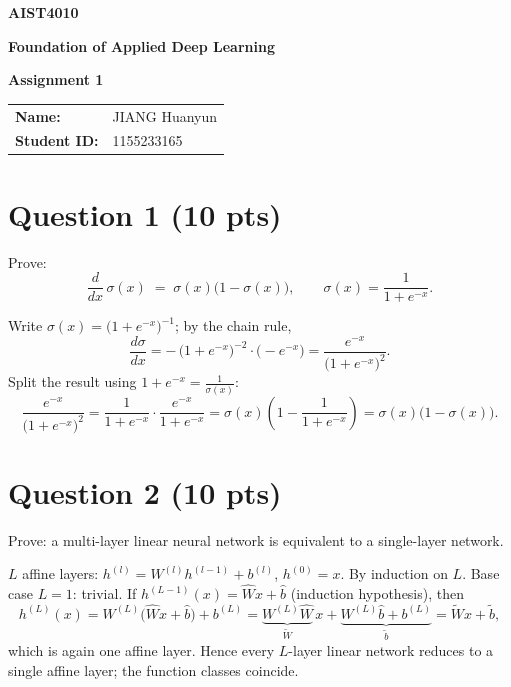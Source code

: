 \documentclass[11pt,a4paper]{article}
\begin{document}
\begin{titlepage}
  \centering
  \vspace*{3.5cm}

  {\Huge\bfseries AIST4010\par}
  \vspace{0.4cm}
  {\LARGE\bfseries Foundation of Applied Deep Learning\par}
  \vspace{1.8cm}
  {\LARGE\bfseries Assignment 1\par}
  \vspace{2.2cm}

  \begin{tabular}{ll}
    \Large\textbf{Name:} & \Large JIANG Huanyun \\[0.8cm]
    \Large\textbf{Student ID:} & \Large 1155233165 \\
  \end{tabular}

  \vfill
\end{titlepage}

\section{Question 1 (10 pts)}

Prove:
\[
\frac{d}{dx}\,\sigma(x) \;=\; \sigma(x)\bigl(1-\sigma(x)\bigr),
\qquad \sigma(x)=\frac{1}{1+e^{-x}} .
\]

Write $\sigma(x)=\bigl(1+e^{-x}\bigr)^{-1}$; by the chain rule,
\[
\frac{d\sigma}{dx}
= -\,\bigl(1+e^{-x}\bigr)^{-2}\cdot\bigl(-e^{-x}\bigr)
= \frac{e^{-x}}{\bigl(1+e^{-x}\bigr)^2} .
\]
Split the result using $1+e^{-x}=\frac{1}{\sigma(x)}$:
\[
\frac{e^{-x}}{\bigl(1+e^{-x}\bigr)^2}
= \frac{1}{1+e^{-x}}\cdot\frac{e^{-x}}{1+e^{-x}}
= \sigma(x)\left(1-\frac{1}{1+e^{-x}}\right)
= \sigma(x)\bigl(1-\sigma(x)\bigr).
\]

\section{Question 2 (10 pts)}

Prove: a multi-layer linear neural network is equivalent to a single-layer network.

$L$ affine layers: $h^{(l)}=W^{(l)}h^{(l-1)}+b^{(l)}$, $h^{(0)}=x$.
By induction on $L$. Base case $L=1$: trivial.
If $h^{(L-1)}(x)=\hat W x+\hat b$ (induction hypothesis), then
\[
h^{(L)}(x) = W^{(L)}\bigl(\hat W x+\hat b\bigr)+b^{(L)}
          = \underbrace{W^{(L)}\hat W}_{\tilde W}\,x
            + \underbrace{W^{(L)}\hat b+b^{(L)}}_{\tilde b}
          = \tilde W x+\tilde b,
\]
which is again one affine layer. Hence every $L$-layer linear network reduces to a
single affine layer; the function classes coincide.
\end{document}
